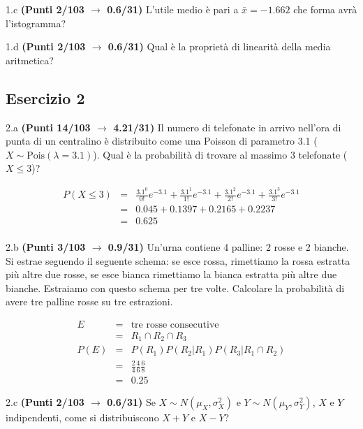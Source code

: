 \documentclass[
  11pt,
]{book}
\theoremstyle{mytheoremstyle}
\theoremstyle{mydefstyle}
\newenvironment{sol}
  {
  \begin{tcolorbox}[enhanced,breakable,arc=0.1mm,boxrule=1pt,colback=white,colframe=iblue,
  title=\bf \fontfamily{lmss}\selectfont \hspace{.5 cm} Soluzione,drop fuzzy shadow]

}{
\end{tcolorbox}
  }
\begin{document}
1.c \textbf{(Punti 2/103 \(\rightarrow\) 0.6/31)} L'utile medio è pari a \(\bar x=-1.662\) che forma avrà l'istogramma?

1.d \textbf{(Punti 2/103 \(\rightarrow\) 0.6/31)} Qual è la proprietà di linearità della media aritmetica?

\subsection{Esercizio 2}\label{esercizio-2-24}

2.a \textbf{(Punti 14/103 \(\rightarrow\) 4.21/31)} Il numero di telefonate in arrivo nell'ora di punta di un centralino è distribuito come una Poisson di parametro 3.1 (\(X\sim\text{Pois}(\lambda=3.1)\)). Qual è la probabilità di trovare al massimo 3 telefonate (\(X\le 3\))?

\begin{sol}
\begin{eqnarray*}
  P(X\le 3) &=&  \frac{3.1^0}{0!}e^{-3.1}+\frac{3.1^1}{1!}e^{-3.1}+\frac{3.1^2}{2!}e^{-3.1}+\frac{3.1^3}{3!}e^{-3.1}\\
  &=& 0.045+0.1397+0.2165+0.2237\\
  &=& 0.625\\
\end{eqnarray*}

\end{sol}

2.b \textbf{(Punti 3/103 \(\rightarrow\) 0.9/31)} Un'urna contiene 4 palline: 2 rosse e 2 bianche. Si estrae seguendo il seguente schema: se esce rossa, rimettiamo la rossa estratta più altre due rosse, se esce bianca rimettiamo la bianca estratta più altre due bianche. Estraiamo con questo schema per tre volte. Calcolare la probabilità di avere tre palline rosse su tre estrazioni.

\begin{sol}
\begin{eqnarray*}
  E &=&  \text{tre rosse consecutive}\\
  &=& R_1\cap R_2 \cap R_3\\
P(E)  &=& P(R_1)P( R_2|R_1) P( R_3|R_1\cap R_2)\\
&=& \frac 24 \frac 46 \frac 68\\
&=& 0.25
\end{eqnarray*}

\end{sol}

2.c \textbf{(Punti 2/103 \(\rightarrow\) 0.6/31)} Se \(X\sim N(\mu_X,\sigma_X^2)\) e \(Y\sim N(\mu_Y,\sigma_Y^2)\), \(X\) e \(Y\) indipendenti, come si distribuiscono \(X+Y\) e \(X-Y\)?
\end{document}
